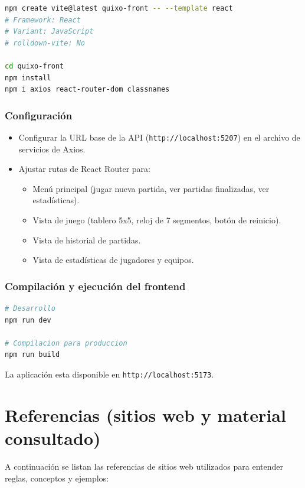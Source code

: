 \documentclass[11pt,a4paper]{article}
\begin{document}
\begin{lstlisting}[language=bash]
npm create vite@latest quixo-front -- --template react
# Framework: React
# Variant: JavaScript
# rolldown-vite: No

cd quixo-front
npm install
npm i axios react-router-dom classnames
\end{lstlisting}

\subsubsection{Configuración}

\begin{itemize}
    \item Configurar la URL base de la API (\texttt{http://localhost:5207}) en el archivo de servicios de Axios.
    \item Ajustar rutas de React Router para:
    \begin{itemize}
        \item Menú principal (jugar nueva partida, ver partidas finalizadas, ver estadísticas).
        \item Vista de juego (tablero 5x5, reloj de 7 segmentos, botón de reinicio).
        \item Vista de historial de partidas.
        \item Vista de estadísticas de jugadores y equipos.
    \end{itemize}
\end{itemize}

\subsubsection{Compilación y ejecución del frontend}

\begin{lstlisting}[language=bash]
# Desarrollo
npm run dev

# Compilacion para produccion
npm run build
\end{lstlisting}

La aplicación esta disponible en \texttt{http://localhost:5173}.

\section{Referencias (sitios web y material consultado)}

A continuación se listan las referencias de sitios web utilizados para entender reglas, conceptos y ejemplos:
\end{document}
